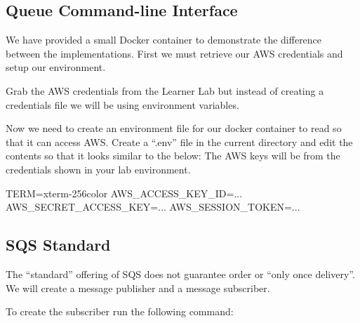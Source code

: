 \documentclass{csse4400}
\begin{document}
\subsection{Queue Command-line Interface}

We have provided a small Docker container to demonstrate the difference between the implementations.
First we must retrieve our AWS credentials and setup our environment.

Grab the AWS credentials from the Learner Lab but instead of creating a credentials file we will be using environment variables.

Now we need to create an environment file for our docker container to read so that it can access AWS. Create a ``.env'' file in the current directory and edit the contents so that it looks similar to the below: The AWS keys will be from the credentials shown in your lab environment.

\begin{code}[numbers=none]{}
TERM=xterm-256color
AWS_ACCESS_KEY_ID=...
AWS_SECRET_ACCESS_KEY=...
AWS_SESSION_TOKEN=...
\end{code}



\subsection{SQS Standard}

The ``standard'' offering of SQS does not guarantee order or ``only once delivery''. 
We will create a message publisher and a message subscriber.


To create the subscriber run the following command:

\end{document}
